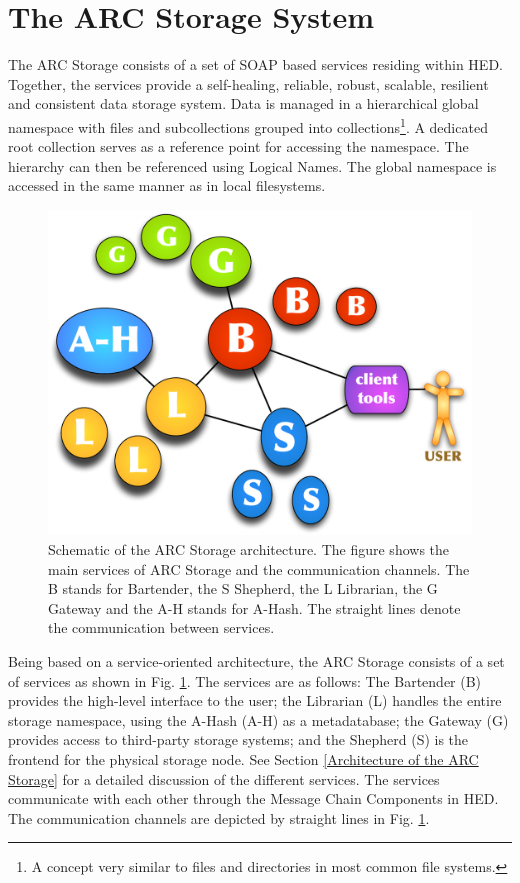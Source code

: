 \documentclass[final]{ieee}
\begin{document}
\section{The ARC Storage System}
\label{The ARC Storage System}

The ARC Storage consists of a set of SOAP based services residing
within HED. Together, the services provide a self-healing, reliable, robust,
scalable, resilient and consistent data storage system. Data is
managed in a hierarchical global namespace with files and
subcollections grouped into collections\footnote{A concept very
  similar to files and directories in most common file systems.}.  A
dedicated root collection serves as a reference point for accessing the namespace. The hierarchy can then be
referenced using Logical Names. The global namespace is accessed
in the same manner as in local filesystems.

\begin{figure}
  \begin{center}
    \includegraphics[width=0.8\columnwidth]{arc1-storage-services-with-gateway.pdf}
  \end{center}
  \caption{Schematic of the ARC Storage architecture. The figure shows
    the main services of ARC Storage and the communication channels. The B stands for Bartender, the S Shepherd, the L Librarian, the G Gateway and the A-H stands for A-Hash. The straight lines denote the communication between services.}
  \label{fig:arc1_storage_service}
\end{figure}


Being based on a service-oriented architecture, the ARC
Storage consists of a set of services as shown in Fig.
\ref{fig:arc1_storage_service}. The services are as follows: The Bartender (B)
provides the high-level interface to the user; the Librarian (L)
handles the entire storage namespace, using the A-Hash (A-H) as a metadatabase; the
Gateway (G) provides access to third-party storage systems; and
the Shepherd (S) is the frontend for the physical storage node. 
See Section \ref{Architecture of the ARC Storage} for a detailed
discussion of the different services.   
The services communicate with each other through the
Message Chain Components in HED. The communication channels are
depicted by straight lines in Fig. \ref{fig:arc1_storage_service}.
\end{document}
